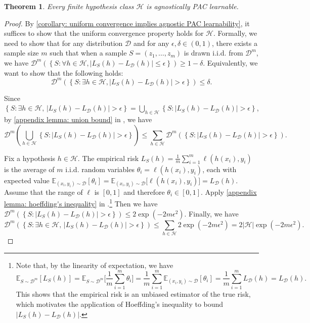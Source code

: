 \documentclass[openany, amssymb, psamsfonts]{amsart}
\newtheorem{thm}{Theorem}[section]
\theoremstyle{definition}
\numberwithin{equation}{section}
\begin{document}
\begin{thm}
Every finite hypothesis class $\mathcal{H}$ is agnostically PAC learnable.
\end{thm}
\begin{proof}
By \autoref{corollary: uniform convergence implies agnostic PAC learnability}, it suffices to show that the uniform convergence property holds for $\mathcal{H}$. Formally, we need to show that for any distribution $\mathcal{D}$ and for any $\epsilon, \delta \in (0,1)$, there exists a sample size $m$ such that when a sample $S = (z_1, \ldots, z_m)$ is drawn i.i.d. from $\mathcal{D}^m$, we have $\mathcal{D}^m(\left\{S \colon \forall h \in \mathcal{H}, |L_S(h) - L_{\mathcal{D}}(h)| \leq \epsilon \right\} ) \geq 1-\delta$. Equivalently, we want to show that the following holds:
\[\mathcal{D}^m(\left\{S \colon \exists h \in \mathcal{H}, |L_S(h) - L_{\mathcal{D}}(h)| > \epsilon \right\} ) \leq \delta.\]

Since $\left\{ S \colon \exists h \in \mathcal{H}, \, |L_S(h) - L_{\mathcal{D}}(h)| > \epsilon \right\} = \bigcup_{h \in \mathcal{H}} \left\{ S \colon |L_S(h) - L_{\mathcal{D}}(h)| > \epsilon \right\}$, by \autoref{appendix lemma: union bound} in , we have
\[\mathcal{D}^m ( \bigcup_{h \in \mathcal{H}} \left\{ S \colon |L_S(h) - L_{\mathcal{D}}(h)| > \epsilon \right\}) \leq \sum_{h \in \mathcal{H}} \mathcal{D}^m(\left\{ S \colon |L_S(h) - L_{\mathcal{D}}(h)| > \epsilon \right\}).\]

Fix a hypothesis $h \in \mathcal{H}$. The empirical risk $L_S(h) = \frac{1}{m} \sum_{i=1}^{m} \ell(h(x_i), y_i)$ is the average of $m$ i.i.d. random variables $\theta_i = \ell(h(x_i), y_i)$, each with expected value $\mathbb{E}_{(x_i,y_i)\sim \mathcal{D}}[\theta_i] = \mathbb{E}_{(x_i,y_i) \sim \mathcal{D}} \big[ \ell(h(x_i), y_i) \big] = L_{\mathcal{D}}(h)$. Assume that the range of $\ell$ is $[0,1]$ and therefore $\theta_i \in [0,1]$. Apply \autoref{appendix lemma: hoeffding's inequality} in .\footnote{Note that, by the linearity of expectation, we have
\[\mathbb{E}_{S \sim \mathcal{D}^m}[L_S(h)]
= \mathbb{E}_{S \sim \mathcal{D}^m}\Big[\frac{1}{m}\sum_{i=1}^m \theta_i\Big]
= \frac{1}{m}\sum_{i=1}^m \mathbb{E}_{(x_i,y_i)\sim \mathcal{D}}[\theta_i]
= \frac{1}{m}\sum_{i=1}^m L_{\mathcal{D}}(h)
= L_{\mathcal{D}}(h).\] This shows that the empirical risk is an unbiased estimator of the true risk, which motivates the application of Hoeffding's inequality to bound $|L_S(h) - L_\mathcal{D}(h)|$.} Then we have $\mathcal{D}^m(\left\{ S \colon |L_S(h) - L_{\mathcal{D}}(h)| > \epsilon \right\})\leq 2 \exp\left(-2 m \epsilon^2 \right)$. Finally, we have
\[
\mathcal{D}^m(\left\{ S : \exists h \in \mathcal{H}, \, |L_S(h) - L_{\mathcal{D}}(h)| > \epsilon \right\}) \leq \sum_{h \in \mathcal{H}} 2 \exp\left(-2 m \epsilon^2 \right) = 2|\mathcal{H}|\exp\left(-2 m \epsilon^2 \right).
\]


\end{proof}
\end{document}
